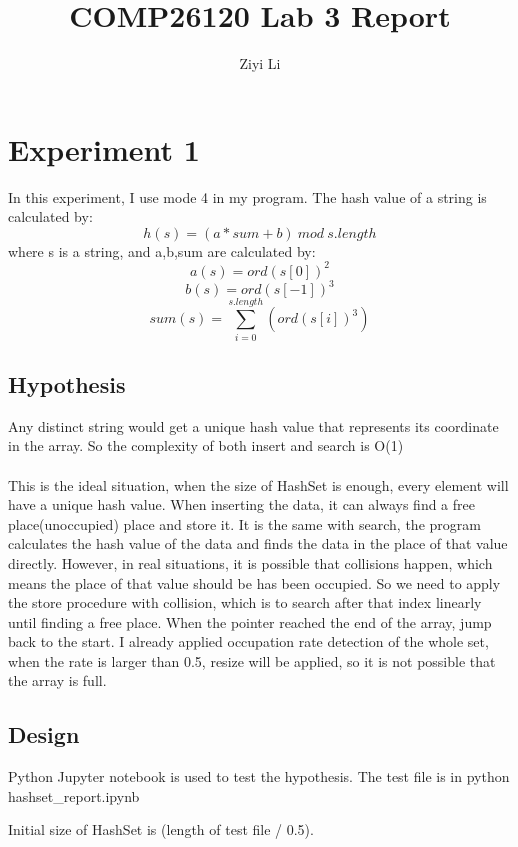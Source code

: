 \documentclass[a4]{article}
\title{COMP26120 Lab 3 Report}
\author{Ziyi Li}
\begin{document}
\maketitle

\section{Experiment 1}

In this experiment, I use mode 4 in my program. The hash value of a string is calculated by:
$$ h(s) = (a * sum + b) \  mod \  s.length$$
where s is a string, and a,b,sum are calculated by:
$$ a(s) = ord(s[0])^2$$
$$ b(s) = ord(s[-1])^3$$
$$ sum(s) = \sum^{s.length}_{i=0}(ord(s[i])^3)$$


\subsection{Hypothesis}

Any distinct string would get a unique hash value that represents its coordinate in the array. 
So the complexity of both insert and search is O(1)
\\ \hspace*{\fill} \\
\noindent This is the ideal situation, when the size of HashSet is enough, every element will have a unique hash value. When inserting the data, it can always find a free place(unoccupied) place and store it. It is the same with search, the program calculates the hash value of the data and finds the data in the place of that value directly. However, in real situations, it is possible that collisions happen, which means the place of that value should be has been occupied. So we need to apply the store procedure with collision, which is to search after that index linearly until finding a free place. When the pointer reached the end of the array, jump back to the start. 
I already applied occupation rate detection of the whole set, when the rate is larger than 0.5, resize will be applied, so it is not possible that the array is full.

\subsection{Design}

Python Jupyter notebook is used to test the hypothesis. The test file is in python hashset\_report.ipynb

\noindent Initial size of HashSet is (length of test file / 0.5).
\end{document}
